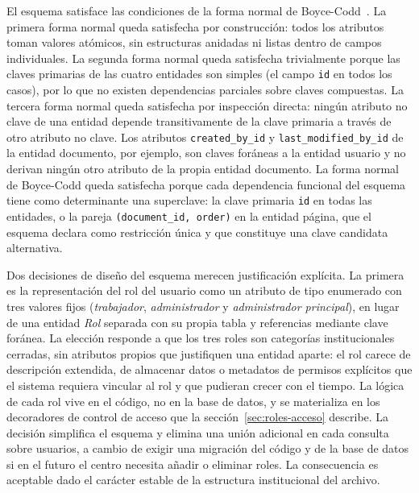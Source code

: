 El esquema satisface las condiciones de la forma normal de Boyce-Codd~\cite{codd1972normalization}. La primera forma normal queda satisfecha por construcción: todos los atributos toman valores atómicos, sin estructuras anidadas ni listas dentro de campos individuales. La segunda forma normal queda satisfecha trivialmente porque las claves primarias de las cuatro entidades son simples (el campo \texttt{id} en todos los casos), por lo que no existen dependencias parciales sobre claves compuestas. La tercera forma normal queda satisfecha por inspección directa: ningún atributo no clave de una entidad depende transitivamente de la clave primaria a través de otro atributo no clave. Los atributos \texttt{created\_by\_id} y \texttt{last\_modified\_by\_id} de la entidad documento, por ejemplo, son claves foráneas a la entidad usuario y no derivan ningún otro atributo de la propia entidad documento. La forma normal de Boyce-Codd queda satisfecha porque cada dependencia funcional del esquema tiene como determinante una superclave: la clave primaria \texttt{id} en todas las entidades, o la pareja \texttt{(document\_id, order)} en la entidad página, que el esquema declara como restricción única y que constituye una clave candidata alternativa.

Dos decisiones de diseño del esquema merecen justificación explícita. La primera es la representación del rol del usuario como un atributo de tipo enumerado con tres valores fijos (\textit{trabajador}, \textit{administrador} y \textit{administrador principal}), en lugar de una entidad \textit{Rol} separada con su propia tabla y referencias mediante clave foránea. La elección responde a que los tres roles son categorías institucionales cerradas, sin atributos propios que justifiquen una entidad aparte: el rol carece de descripción extendida, de almacenar datos o metadatos de permisos explícitos que el sistema requiera vincular al rol y que pudieran crecer con el tiempo. La lógica de cada rol vive en el código, no en la base de datos, y se materializa en los decoradores de control de acceso que la sección~\ref{sec:roles-acceso} describe. La decisión simplifica el esquema y elimina una unión adicional en cada consulta sobre usuarios, a cambio de exigir una migración del código y de la base de datos si en el futuro el centro necesita añadir o eliminar roles. La consecuencia es aceptable dado el carácter estable de la estructura institucional del archivo.

